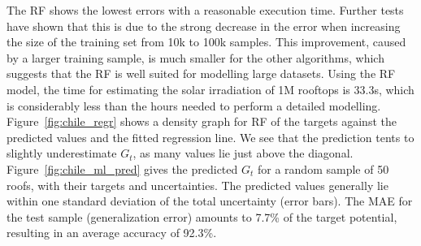 The RF shows the lowest errors with a reasonable execution time. Further tests have shown that this is due to the strong decrease in the error when increasing the size of the training set from 10k to 100k samples. This improvement, caused by a larger training sample, is much smaller for the other algorithms, which suggests that the RF is well suited for modelling large datasets. Using the RF model, the time for estimating the solar irradiation of 1M rooftops is 33.3s, which is considerably less than the hours needed to perform a detailed modelling. Figure~\ref{fig:chile_regr} shows a density graph for RF of the targets against the predicted values and the fitted regression line. We see that the prediction tents to slightly underestimate $G_t$, as many values lie just above the diagonal. Figure~\ref{fig:chile_ml_pred} gives the predicted $G_t$ for a random sample of 50 roofs, with their targets and uncertainties. The predicted values generally lie within one standard deviation of the total uncertainty (error bars). The MAE for the test sample (generalization error) amounts to 7.7\% of the target potential, resulting in an average accuracy of 92.3\%. 

